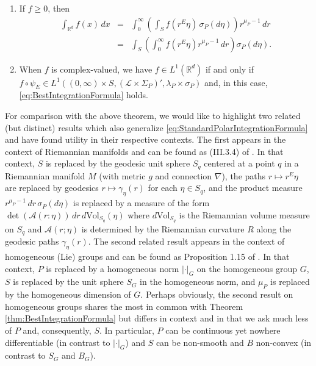 \documentclass[smallextended]{svjour3}
\theoremstyle{remark}
\renewcommand\det{\operatorname{det}}
\begin{document}
\begin{theorem}
\begin{enumerate}
\begin{enumerate}
\item If $f\geq 0$, then
\begin{eqnarray}\label{eq:BestIntegrationFormula}
\int_{\mathbb{R}^d}f(x)\,dx&=&\int_0^\infty\left(\int_S f(r^E\eta)\,\sigma_P(d\eta)\right)r^{\mu_P-1}\,dr\nonumber \\
&=&\int_S\left(\int_0^\infty f(r^E\eta)r^{\mu_P-1}\,dr\right)\sigma_P(d\eta).
\end{eqnarray}
\item When $f$ is complex-valued, we have $f\in L^1(\mathbb{R}^d)$ if and only if $f\circ\psi_E\in L^1\left((0,\infty)\times S,(\mathcal{L}\times\Sigma_P)',\lambda_P\times\sigma_P\right)$ and, in this case, \eqref{eq:BestIntegrationFormula} holds.
\end{enumerate}
\end{enumerate}
\end{theorem}

\noindent For comparison with the above theorem, we would like to highlight two related (but distinct) results which also generalize \eqref{eq:StandardPolarIntegrationFormula} and have found utility in their respective contexts. The first appears in the context of Riemannian manifolds and can be found as (III.3.4) of \cite{chavel_riemannian_2006}. In that context, $S$ is replaced by the geodesic unit sphere $S_q$ centered at a point $q$ in a Riemannian manifold $M$ (with metric $g$ and connection $\nabla$), the paths $r\mapsto r^E\eta$ are replaced by geodesics $r\mapsto \gamma_\eta(r)$ for each $\eta\in S_q$, and the product measure $r^{\mu_P-1}\,dr\,\sigma_P(d\eta)$ is replaced by a measure of the form $\det(\mathcal{A}(r:\eta))\,dr\, d\mbox{Vol}_{S_q}(\eta)$ where $d\mbox{Vol}_{S_q}$ is the Riemannian volume measure on $S_q$ and $\mathcal{A}(r;\eta)$ is determined by the Riemannian curvature $R$ along the geodesic paths $\gamma_{\eta}(r)$. The second related result appears in the context of homogeneous (Lie) groups and can be found as Proposition 1.15 of \cite{folland_hardy_1982}. In that context, $P$ is replaced by a homogeneous norm $|\cdot|_G$ on the homogeneous group $G$, $S$ is replaced by  the unit sphere $S_G$ in the homogeneous norm, and $\mu_P$ is replaced by the homogeneous dimension of $G$. Perhaps obviously, the second result on homogeneous groups shares the most in common with Theorem \ref{thm:BestIntegrationFormula} but differs in context and in that we ask much less of $P$ and, consequently, $S$. In particular, $P$ can be continuous yet nowhere differentiable (in contrast to $|\cdot|_G$) and $S$ can be non-smooth and $B$ non-convex (in contrast to $S_G$ and $B_G$).\\
\end{document}
